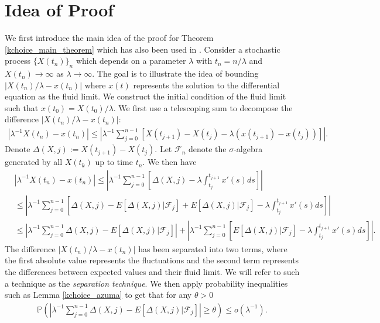 \documentclass[12pt]{article}
\def\P{\mathbb{P}}
\numberwithin{equation}{section}  %
\begin{document}
\section{Idea of Proof}\label{k_summaryofproof}
We first introduce the main idea of the proof for Theorem \ref{kchoice_main_theorem} which has also been used in \cite{Ck21}. Consider a stochastic process $\{X(t_n)\}_n$ which depends on a parameter $\lambda$ with $t_n=n/\lambda$ and $X(t_n)\rightarrow \infty$ as $\lambda\rightarrow \infty$. The goal is to illustrate the idea of bounding $|X(t_n)/\lambda-x(t_n)|$ where $x(t)$ represents the solution to the differential equation as the fluid limit. We construct the initial condition of the fluid limit such that $x(t_0)=X(t_0)/\lambda$. We first use a telescoping sum to decompose the difference $|X(t_n)/\lambda-x(t_n)|$:
\begin{align*}
|\lambda^{-1} X(t_n)-x(t_n)|\leq\left|\lambda^{-1}\sum_{j=0}^{n-1} \left[ X(t_{j+1})-X(t_{j})-\lambda(x(t_{j+1})-x(t_{j})) \right]\right|.
\end{align*}
Denote $\Delta(X,j):= X(t_{j+1})-X(t_{j})$. Let $\mathcal{F}_n$ denote the  $\sigma$-algebra generated by all $X(t_k)$ up to time $t_n$. We then have
\begin{align}
&|\lambda^{-1} X(t_n)-x(t_n)|\leq \left|\lambda^{-1}\sum_{j=0}^{n-1} \left[ \Delta(X,j)-\lambda\int_{t_j}^{t_{j+1}}x'(s)ds\right]  \right|\label{kchoice_main_idea1}\\
&\leq \left|\lambda^{-1}\sum_{j=0}^{n-1} \left[ \Delta(X,j)-E[\Delta(X,j)|\mathcal{F}_{j}]+E[\Delta(X,j)|\mathcal{F}_{j}]-\lambda\int_{t_j}^{t_{j+1}}x'(s)ds\right]  \right|\nonumber\\
&\leq \left|\lambda^{-1}\sum_{j=0}^{n-1}  \Delta(X,j)-E[\Delta(X,j)|\mathcal{F}_{j}]\right|+
\left|\lambda^{-1}\sum_{j=0}^{n-1}\left[ E[\Delta(X,j)|\mathcal{F}_{j}]-\lambda\int_{t_j}^{t_{j+1}}x'(s)ds\right] \right|\nonumber.
\end{align}
The difference $|X(t_n)/\lambda-x(t_n)|$ has been separated into two terms, where the first absolute value represents the fluctuations and the second term represents the differences between expected values and their fluid limit. We will refer to such a technique as the \textit{separation technique}. We then apply probability inequalities such as Lemma \ref{kchoice_azuma} to get that for any $\theta>0$
\begin{align}
\P \left(\left|\lambda^{-1}\sum_{j=0}^{n-1}  \Delta(X,j)-E[\Delta(X,j)|\mathcal{F}_{j}]\right|\geq \theta \right)\leq o(\lambda^{-1})\label{kchoice_main_idea2}.
\end{align} 
\end{document}
